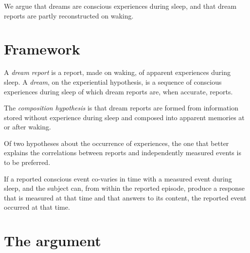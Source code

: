 \documentclass{situationist-preprint}
\begin{document}
We argue that dreams are conscious experiences during sleep, and that dream reports are partly reconstructed on waking.

\section{Framework}

\begin{definition}\label{d:dream}
A \emph{dream report} is a report, made on waking, of apparent experiences during sleep. A \emph{dream}, on the experiential hypothesis, is a sequence of conscious experiences during sleep of which dream reports are, when accurate, reports.
\end{definition}

\begin{definition}\label{d:comp}
The \emph{composition hypothesis} is that dream reports are formed from information stored without experience during sleep and composed into apparent memories at or after waking.
\end{definition}

\begin{principle}\label{p:ibe}
Of two hypotheses about the occurrence of experiences, the one that better explains the correlations between reports and independently measured events is to be preferred.
\end{principle}

\begin{principle}[Timing]\label{p:time}
If a reported conscious event co-varies in time with a measured event during sleep, and the subject can, from within the reported episode, produce a response that is measured at that time and that answers to its content, the reported event occurred at that time.
\end{principle}

\section{The argument}
\end{document}
